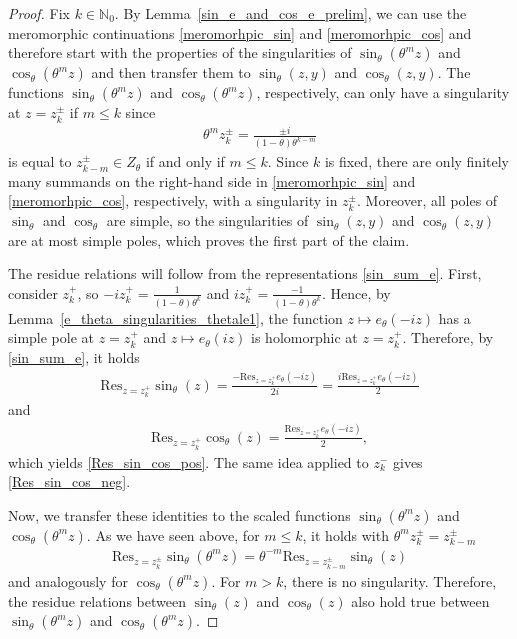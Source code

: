 \documentclass[10pt,a4paper]{amsart}
\newcommand{\N}{\mathbb{N}} %
\newcommand{\1}{\mathds{1}}
\begin{document}
 \begin{proof}
    Fix $k\in\N_0$. By Lemma~\ref{sin_e_and_cos_e_prelim}, we can use the meromorphic continuations \eqref{meromorhpic_sin} and \eqref{meromorhpic_cos}
     and therefore start with the properties of the singularities of $\sin_\theta(\theta^m z)$ and $\cos_\theta(\theta^m z)$ and then transfer them to $\sin_\theta(z,y)$ and $\cos_\theta(z,y)$. The functions $\sin_\theta(\theta^m z)$ and $\cos_\theta(\theta^m z)$, respectively, can only have a singularity at $z=z_k^\pm$ if $m\le k$ since 
    \begin{align*}
        \theta^mz_k^\pm=\frac{\pm i}{(1-\theta)\theta^{k-m}}
    \end{align*}
    is equal to $ z_{k-m}^\pm\in Z_\theta$ if and only if $m\le k$. Since $k$ is fixed, there are only finitely many summands on the right-hand side in \eqref{meromorhpic_sin} and \eqref{meromorhpic_cos}, respectively, with a singularity in $z_k^\pm$. Moreover, all poles of $\sin_\theta$ and $\cos_\theta$ are simple, so the singularities of $\sin_\theta(z,y)$ and $\cos_\theta(z,y)$ are at most simple poles, which proves the first part of the claim.
    
    The residue relations will follow from the representations \eqref{sin_sum_e}. 
    First, consider $z_k^+$, so $-iz_k^+=\frac{1}{(1-\theta)\theta ^k}$ and $iz_k^+=\frac{-1}{(1-\theta)\theta ^k}$. Hence, by Lemma~\ref{e_theta_singularities_thetale1}, the function $z\mapsto e_\theta(-iz)$ has a simple pole at $z=z_k^+$ and $z\mapsto e_\theta(iz)$ is holomorphic at $z=z_k^+$. Therefore, by \eqref{sin_sum_e},
    it holds
    \begin{align*}
        \mathrm{Res}_{z=z_k^+}\sin_\theta(z)=\frac{-\mathrm{Res}_{z=z_k^+}e_\theta(-iz)}{2i}=
        \frac{i\mathrm{Res}_{z=z_k^+}e_\theta(-iz)}{2}
    \end{align*}
    and
    \begin{align*}
        \mathrm{Res}_{z=z_k^+}\cos_\theta(z)=\frac{\mathrm{Res}_{z=z_k^+}e_\theta(-iz)}{2},
    \end{align*}
    which yields \eqref{Res_sin_cos_pos}.
    The same idea applied to $z_k^-$ gives \eqref{Res_sin_cos_neg}.
    
    Now, we transfer these identities to the scaled functions $\sin_\theta(\theta^m z)$ and $\cos_\theta(\theta^m z)$. As we have seen above, for $m\le k$, it holds with $\theta^m z_k^\pm=z_{k-m}^\pm$
    \begin{align*}
        \mathrm{Res}_{z=z_k^\pm}\sin_\theta(\theta ^mz)=\theta^{-m}\mathrm{Res}_{z=z_{k-m}^\pm}\sin_\theta(z)
    \end{align*}
    and analogously for $\cos_\theta(\theta^m z)$. For $m>k$, there is no singularity. Therefore, the residue relations between $\sin_\theta(z)$ and $\cos_\theta(z)$ also hold true between $\sin_\theta(\theta^mz)$ and $\cos_\theta(\theta^m z)$.
    

\end{proof}
\end{document}
